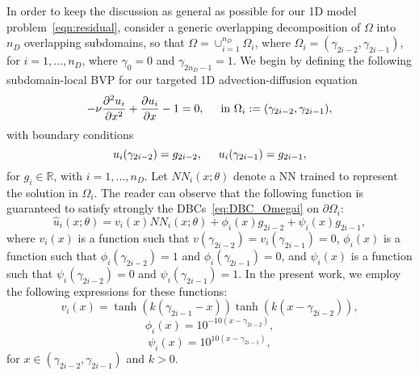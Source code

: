 \documentclass[oneside,final]{csri23}
\begin{document}
In order to keep the discussion as general as possible for our 1D model problem~\eqref{eqn:residual}, consider a generic overlapping decomposition of $\Omega$ into $n_{D}$ overlapping subdomains, so that $\Omega = \cup_{i=1}^{n_{D}} \Omega_i$, where $\Omega_i = (\gamma_{2i-2}, \gamma_{2i-1})$, for $i=1, ..., n_D$, where $\gamma_0 = 0 $ and $\gamma_{2n_D-1} = 1$.  We begin by defining the following subdomain-local BVP for our targeted 1D advection-diffusion equation
\begin{equation}
    -{\nu}\frac{\partial^2 u_i}{\partial x^2}+\frac{\partial u_i}{\partial x}-1=0, \hspace{0.5cm} \text{in  }\Omega_i:= (\gamma_{2i-2}, \gamma_{2i-1}),
\end{equation}
with boundary conditions
\begin{equation} \label{eq:DBC_Omegai}
    u_i(\gamma_{2i-2}) = g_{2i-2}, \hspace{0.5cm} u_i(\gamma_{2i-1}) = g_{2i-1},  
\end{equation}
for $g_i \in \mathbb{R}$, with $i=1,..., n_D$.  Let $NN_i(x; \theta)$ denote a NN trained to represent the solution in $\Omega_i$.  The reader can observe that the following function is guaranteed to satisfy strongly the DBCs~\eqref{eq:DBC_Omegai} on $\partial \Omega_i$:
\begin{equation}
    \hat{u}_i (x; \theta) = v_i(x) NN_i(x; \theta) + \phi_i(x) g_{2i-2} + \psi_i(x) g_{2i-1},
\end{equation}
where $v_i(x)$ is a function such that $v(\gamma_{2i-2}) = v_i(\gamma_{2i-1}) = 0$, $\phi_i(x)$ is a function such that $\phi_i(\gamma_{2i-2}) = 1 $ and $\phi_i(\gamma_{2i-1}) = 0$, and $\psi_i(x)$ is a function such that $\psi_i(\gamma_{2i-2}) = 0$ and $\psi_i(\gamma_{2i-1}) = 1$.  In the present work, we employ the following expressions for these functions:
\begin{equation}
    v_i(x) = \tanh(k(\gamma_{2i-1}-x))\tanh(k(x - \gamma_{2i-2})),
    \label{eqn:v_x}
\end{equation}
\begin{equation} \label{eq:phi_i}
    \phi_i(x) = 10^{-10(x-\gamma_{2i-2})},
\end{equation}
\begin{equation} \label{eq:psi_i}
    \psi_i(x) = 10^{10(x-\gamma_{2i-1})},
\end{equation}
for $x \in (\gamma_{2i-2}, \gamma_{2i-1})$ and $k>0$. 
\end{document}
